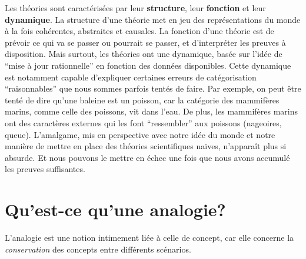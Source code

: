 \documentclass[french]{article}
\begin{document}
				Les théories sont caractérisées par leur \textbf{structure}, leur \textbf{fonction} et leur \textbf{dynamique}. La structure d'une théorie met en jeu des représentations du monde à la fois cohérentes, abstraites et causales. La fonction d'une théorie est de prévoir ce qui va se passer ou pourrait se passer, et d'interpréter les preuves à disposition.
				Mais surtout, les théories ont une dynamique, basée sur l'idée de ``mise à jour rationnelle'' en fonction des données disponibles. Cette dynamique est notamment capable d'expliquer certaines erreurs de catégorisation ``raisonnables'' que nous sommes parfois tentés de faire. Par exemple, on peut être tenté de dire qu'une baleine est un poisson, car la catégorie des mammifères marins, comme celle des poissons, vit dans l'eau. De plus, les mammifères marins ont des caractères externes qui les font ``ressembler'' aux poissons (nageoires, queue). L'amalgame, mis en perspective avec notre idée du monde et notre manière de mettre en place des théories scientifiques naïves, n'apparaît plus si absurde. Et nous pouvons le mettre en échec une fois que nous avons accumulé les preuves suffisantes.
		
		\section{Qu'est-ce qu'une analogie?}
			L'analogie est une notion intimement liée à celle de concept, car elle concerne la \textit{conservation} des concepts entre différents scénarios.
\end{document}
